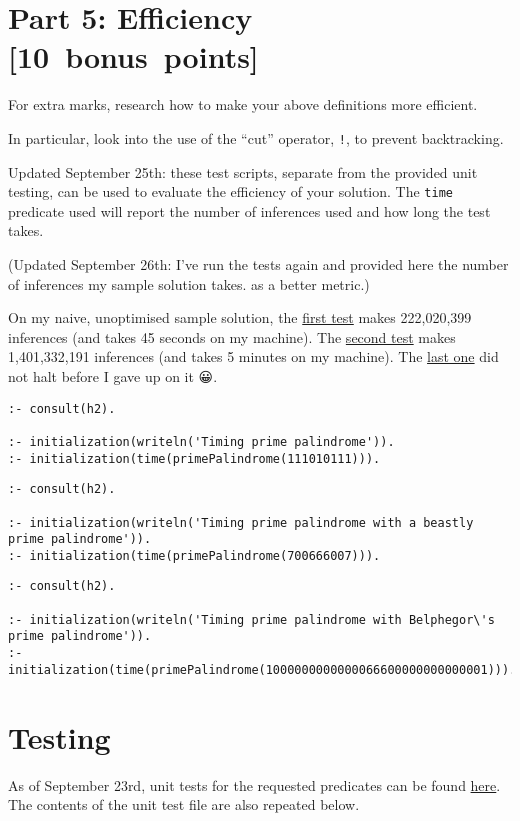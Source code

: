 \documentclass[11pt]{article}
\begin{document}
\section*{Part 5: Efficiency                                     [10 bonus points]}
\label{sec:orgb124c51}
For extra marks, research how to make your above definitions more efficient.

In particular, look into the use of the “cut” operator, \texttt{!},
to prevent backtracking.

Updated September 25th: these test scripts,
separate from the provided unit testing, can be used
to evaluate the efficiency of your solution.
The \texttt{time} predicate used will report the number
of inferences used and how long the test takes.

(Updated September 26th: I've run the tests again
and provided here the number of inferences
my sample solution takes. as a better metric.)

On my naive, unoptimised sample solution,
the \href{./testing/h2/h2-timing.pl}{first test} makes 222,020,399 inferences (and takes 45 seconds on my machine).
The \href{./testing/h2/h2-beastly-timing.pl}{second test} makes 1,401,332,191 inferences (and takes 5 minutes on my machine).
The \href{./testing/h2/h2-belphegor-timing.pl}{last one} did not halt before I gave up on it 😀.
\begin{verbatim}
:- consult(h2).

:- initialization(writeln('Timing prime palindrome')).
:- initialization(time(primePalindrome(111010111))).
\end{verbatim}
\begin{verbatim}
:- consult(h2).

:- initialization(writeln('Timing prime palindrome with a beastly prime palindrome')).
:- initialization(time(primePalindrome(700666007))).
\end{verbatim}
\begin{verbatim}
:- consult(h2).

:- initialization(writeln('Timing prime palindrome with Belphegor\'s prime palindrome')).
:- initialization(time(primePalindrome(1000000000000066600000000000001))).
\end{verbatim}

\section*{Testing}
\label{sec:org9815f51}
As of September 23rd, unit tests for the requested predicates
can be found \href{./testing/h2/h2.plt}{here}. The contents of the unit test file are also repeated below.
\end{document}
